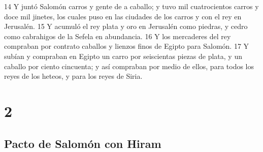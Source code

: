 14 Y juntó Salomón carros y gente de a caballo; y tuvo mil cuatrocientos carros y doce mil jinetes, los cuales puso en las ciudades de los carros y con el rey en Jerusalén.
15 Y acumuló el rey plata y oro en Jerusalén como piedras, y cedro como cabrahigos de la Sefela en abundancia.
16 Y los mercaderes del rey compraban por contrato caballos y lienzos finos de Egipto para Salomón. 
17 Y subían y compraban en Egipto un carro por seiscientas piezas de plata, y un caballo por ciento cincuenta; y así compraban por medio de ellos, para todos los reyes de los heteos, y para los reyes de Siria.

\chapter{2}

\section*{Pacto de Salomón con Hiram }

